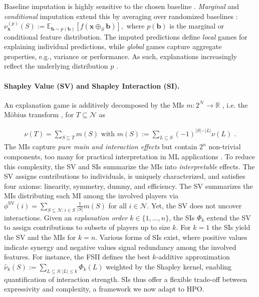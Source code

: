 \documentclass[letterpaper]{article} %
\begin{document}
Baseline imputation is highly sensitive to the chosen baseline \citep{sturmfels2020visualizing}. \emph{Marginal} and \emph{conditional} imputation extend this by averaging over randomized baselines \cite{Sundararajan.2020b}: 
$\nu_{\mathbf{x}}^{(p)}(S) := \mathbb{E}_{\mathbf{b} \sim p(\mathbf{b})}[f(\mathbf{x} \oplus_S \mathbf{b})],$
where $p(\mathbf{b})$ is the marginal or conditional feature distribution.
The imputed predictions define \emph{local} games for explaining individual predictions, while \emph{global} games capture aggregate properties, e.g., variance or performance.
As such, explanations increasingly reflect the underlying distribution $p$ \citep{Fumagalli.2024a}.

\paragraph{Shapley Value (SV) and Shapley Interaction (SI).}
An explanation game is additively decomposed by the \glspl*{MI} $m:2^{\mathcal N} \to \mathbb{R}$ \citep{Muschalik.2024}, i.e. the Möbius transform \citep{rota1964foundations}, for $T \subseteq \mathcal N$ as

\begin{align*}
     \nu(T) = \sum_{S \subseteq T} m(S) \text{ with } m(S) := \sum_{L \subseteq S} (-1)^{\vert S \vert - \vert L \vert} \nu(L) \, \, .
\end{align*}
The \glspl*{MI} capture \emph{pure main and interaction effects} but contain $2^n$ non-trivial components, too many for practical interpretation in ML applications \citep{Muschalik.2024}.
To reduce this complexity, the \gls*{SV} and \glspl*{SI} summarize the \glspl*{MI} into \emph{interpretable} effects.
The \gls*{SV} assigns contributions to individuals, is uniquely characterized, and satisfies four axioms: linearity, symmetry, dummy, and efficiency.
The \gls*{SV} summarizes the \glspl*{MI} distributing each \gls*{MI} among the involved players via $\phi^{\text{SV}}(i) = \sum_{S \subseteq \mathcal{N}: i \in S} \frac{1}{\vert S \vert} m(S)$ for all $i \in \mathcal{N}$.
Yet, the \gls*{SV} does not uncover interactions.
Given an \emph{explanation order} $k \in \{1,\dots,n\}$, the \glspl*{SI} $\Phi_k$ extend the \gls*{SV} to assign contributions to subsets of players up to size $k$.
For $k=1$ the \glspl*{SI} yield the \gls*{SV} and the \glspl*{MI} for $k=n$.
Various forms of \glspl*{SI} exist, where positive values indicate synergy and negative values signal redundancy among the involved features.
For instance, the \gls*{FSII} \citep{Tsai.2022} defines the best $k$-additive approximation $\hat{\nu}_k(S) := \sum_{L \subseteq S:\vert L\vert \leq k}{\Phi_k(L)}$ weighted by the Shapley kernel, enabling quantification of interaction strength.
\glspl{SI} thus offer a flexible trade-off between expressivity and complexity, a framework we now adapt to HPO.
\end{document}
